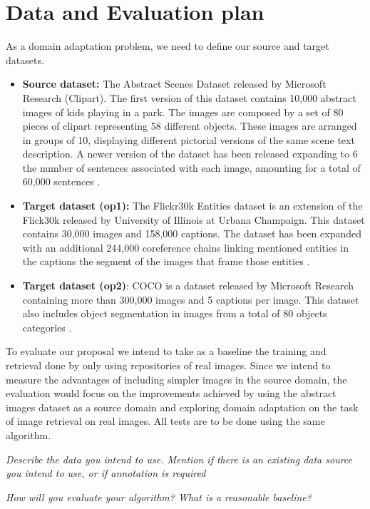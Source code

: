 \documentclass[11pt]{article}
\begin{document}
\section{Data and Evaluation plan}

As a domain adaptation problem, we need to define our source and target datasets. 

\begin{itemize}
\item \textbf{Source dataset:} The Abstract Scenes Dataset released by Microsoft Research (Clipart). The first version of this dataset contains 10,000 abstract images of kids playing in a park. The images are composed by a set of 80 pieces of clipart representing 58 different objects. These images are arranged in groups of 10, displaying different pictorial versions of the same scene text description. A newer version of the dataset has been released expanding to 6 the number of sentences associated with each image, amounting for a total of 60,000 sentences \cite{}. 
\item \textbf{Target dataset (op1):} The Flickr30k Entities dataset is an extension of the Flick30k released by University of Illinois at Urbana Champaign. This dataset contains 30,000 images and 158,000 captions. The dataset has been expanded with an additional 244,000 coreference chains linking mentioned entities in the captions the segment of the images that frame those entities \cite{}. 
\item \textbf{Target dataset (op2)}: COCO is a dataset released by Microsoft Research containing more than 300,000 images and 5 captions per image. This dataset also includes object segmentation in images from a total of 80 objects categories \cite{}. 
\end{itemize}


To evaluate our proposal we intend to take as a baseline the training and retrieval done by only using repositories of real images. Since we intend to measure the advantages of including simpler images in the source domain, the evaluation would focus on the improvements achieved by using the abstract images dataset as a source domain and exploring domain adaptation on the task of image retrieval on real images. All tests are to be done using the same algorithm. 


\textit{Describe the data you intend to use. Mention if there is an existing data source you intend to use, or if annotation is required}

\textit{How will you evaluate your algorithm? What is a reasonable baseline?}
\end{document}
